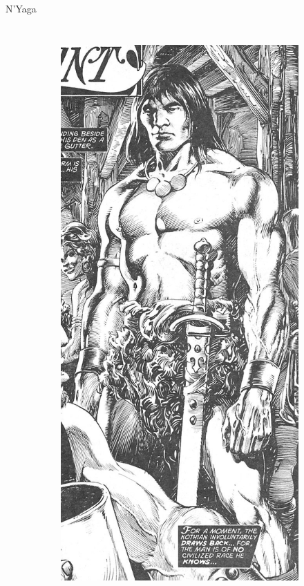 \begin{frame}{N'Yaga}
\begin{columns}
\begin{figure}[htp]
\begin{subfigure}[b]{0.23\textwidth}
				\includegraphics[width=\textwidth]{img/conan/TSSC}
			\end{subfigure}
		\end{figure}
	\end{columns}
\end{frame}
\note[itemize]{
	\item
}

